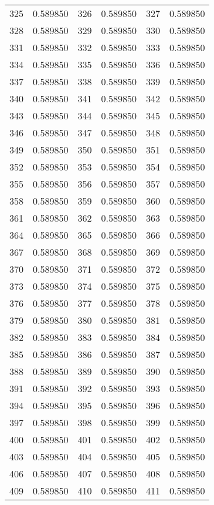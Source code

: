 \documentclass[12pt]{article}
\begin{document}
\begin{longtable}{@{}cc|cc|cc@{}}
325 & 0.589850 & 326 & 0.589850 & 327 & 0.589850 \\
328 & 0.589850 & 329 & 0.589850 & 330 & 0.589850 \\
331 & 0.589850 & 332 & 0.589850 & 333 & 0.589850 \\
334 & 0.589850 & 335 & 0.589850 & 336 & 0.589850 \\
337 & 0.589850 & 338 & 0.589850 & 339 & 0.589850 \\
340 & 0.589850 & 341 & 0.589850 & 342 & 0.589850 \\
343 & 0.589850 & 344 & 0.589850 & 345 & 0.589850 \\
346 & 0.589850 & 347 & 0.589850 & 348 & 0.589850 \\
349 & 0.589850 & 350 & 0.589850 & 351 & 0.589850 \\
352 & 0.589850 & 353 & 0.589850 & 354 & 0.589850 \\
355 & 0.589850 & 356 & 0.589850 & 357 & 0.589850 \\
358 & 0.589850 & 359 & 0.589850 & 360 & 0.589850 \\
361 & 0.589850 & 362 & 0.589850 & 363 & 0.589850 \\
364 & 0.589850 & 365 & 0.589850 & 366 & 0.589850 \\
367 & 0.589850 & 368 & 0.589850 & 369 & 0.589850 \\
370 & 0.589850 & 371 & 0.589850 & 372 & 0.589850 \\
373 & 0.589850 & 374 & 0.589850 & 375 & 0.589850 \\
376 & 0.589850 & 377 & 0.589850 & 378 & 0.589850 \\
379 & 0.589850 & 380 & 0.589850 & 381 & 0.589850 \\
382 & 0.589850 & 383 & 0.589850 & 384 & 0.589850 \\
385 & 0.589850 & 386 & 0.589850 & 387 & 0.589850 \\
388 & 0.589850 & 389 & 0.589850 & 390 & 0.589850 \\
391 & 0.589850 & 392 & 0.589850 & 393 & 0.589850 \\
394 & 0.589850 & 395 & 0.589850 & 396 & 0.589850 \\
397 & 0.589850 & 398 & 0.589850 & 399 & 0.589850 \\
400 & 0.589850 & 401 & 0.589850 & 402 & 0.589850 \\
403 & 0.589850 & 404 & 0.589850 & 405 & 0.589850 \\
406 & 0.589850 & 407 & 0.589850 & 408 & 0.589850 \\
409 & 0.589850 & 410 & 0.589850 & 411 & 0.589850 \\

\end{longtable}
\end{document}
